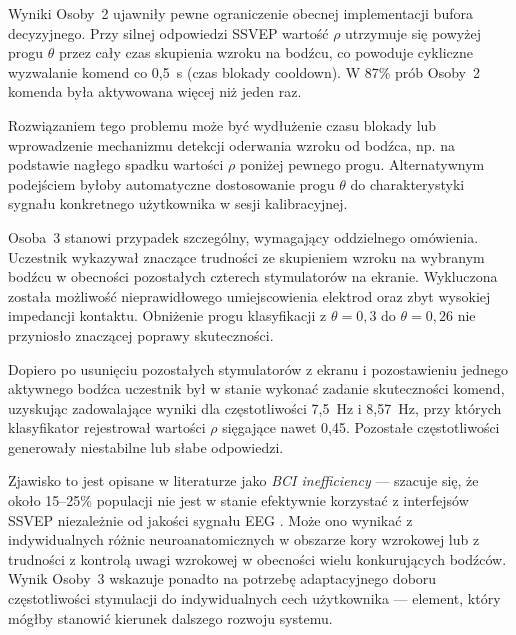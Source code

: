 Wyniki Osoby~2 ujawniły pewne ograniczenie obecnej implementacji
bufora decyzyjnego. Przy silnej odpowiedzi SSVEP wartość $\rho$
utrzymuje się powyżej progu $\theta$ przez cały czas skupienia
wzroku na bodźcu, co powoduje cykliczne wyzwalanie komend
co 0,5~s (czas blokady cooldown). W 87\% prób Osoby~2
komenda była aktywowana więcej niż jeden raz.

Rozwiązaniem tego problemu może być wydłużenie czasu blokady
lub wprowadzenie mechanizmu detekcji oderwania wzroku
od bodźca, np. na podstawie nagłego spadku wartości $\rho$
poniżej pewnego progu. Alternatywnym podejściem
byłoby automatyczne dostosowanie progu $\theta$ do
charakterystyki sygnału konkretnego użytkownika
w sesji kalibracyjnej.

Osoba~3 stanowi przypadek szczególny, wymagający oddzielnego omówienia.
Uczestnik wykazywał znaczące trudności ze skupieniem wzroku na wybranym
bodźcu w obecności pozostałych czterech stymulatorów na ekranie.
Wykluczona została możliwość nieprawidłowego umiejscowienia elektrod
oraz zbyt wysokiej impedancji kontaktu. Obniżenie progu klasyfikacji
z $\theta = 0{,}3$ do $\theta = 0{,}26$ nie przyniosło
znaczącej poprawy skuteczności.

Dopiero po usunięciu pozostałych stymulatorów z ekranu
i pozostawieniu jednego aktywnego bodźca uczestnik był
w stanie wykonać zadanie skuteczności komend, uzyskując
zadowalające wyniki dla częstotliwości 7,5~Hz i 8,57~Hz,
przy których klasyfikator rejestrował wartości $\rho$
sięgające nawet 0,45. Pozostałe częstotliwości generowały
niestabilne lub słabe odpowiedzi.

Zjawisko to jest opisane w literaturze jako
\textit{BCI inefficiency} --- szacuje się, że około 15--25\%
populacji nie jest w stanie efektywnie korzystać z interfejsów
SSVEP niezależnie od jakości sygnału EEG \cite{vialatte2010}.
Może ono wynikać z indywidualnych różnic neuroanatomicznych
w obszarze kory wzrokowej lub z trudności z kontrolą
uwagi wzrokowej w obecności wielu konkurujących bodźców.
Wynik Osoby~3 wskazuje ponadto na potrzebę adaptacyjnego
doboru częstotliwości stymulacji do indywidualnych
cech użytkownika --- element, który mógłby stanowić
kierunek dalszego rozwoju systemu.





